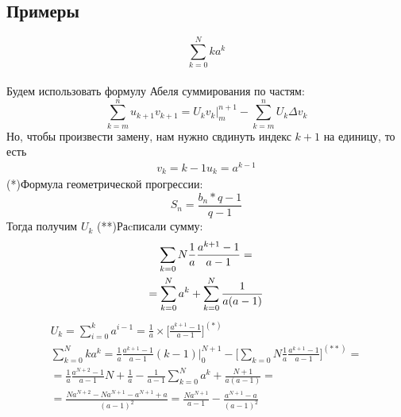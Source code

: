 \documentclass[a4paper,11pt]{article}
\begin{document}
  \subsection{Примеры}
    \[\sum_{k=0}^N ka^k\] \\
    Будем использовать формулу Абеля суммирования по частям: \\
    \[\sum_{k=m}^{n} u_{k+1} v_{k+1} = U_k v_k \bigg|_{m}^{n+1} - \sum_{k=m}^{n} U_k \Delta v_k\]
    Но, чтобы произвести замену, нам нужно свдинуть индекс $k+1$ на единицу, то есть \\
    \begin{equation*}
      \begin{split}
      v_k = k - 1
      u_k = a^{k-1}
      \end{split}
    \end{equation*}
    \marginpar
    {
      \footnotesize (*)Формула геометрической прогрессии:
      \footnotesize \[S_n = \frac{b_n*q-1}{q-1}\]
    }
    Тогда получим $U_k$
    \marginpar
    {
      \footnotesize (**)Раcписали сумму:
      \begin{gather*}
        \footnotesize \sum_{k=0}{N} \frac{1}{a} \frac{a^{k+1}-1}{a-1} = \\
        = \sum_{k=0}^{N}a^k + \sum_{k=0}^{N}\frac{1}{a(a-1)}
      \end{gather*}
    }
    \begin{equation*}
      \begin{split}
        U_k = \sum_{i=0}^{k}a^{i-1} = \frac{1}{a} \times \bigg[ \frac{a^{k+1}-1}{a-1} \bigg]^{(*)} \\
        \sum_{k=0}^{N}ka^k = \frac{1}{a} \frac{a^{k+1}-1}{a-1}(k-1) \bigg|_{0}^{N+1} - \bigg[\sum_{k=0}{N} \frac{1}{a} \frac{a^{k+1}-1}{a-1} \bigg]^{(**)} = \\
        = \frac{1}{a} \frac{a^{N+2}-1}{a-1}N + \frac{1}{a} - \frac{1}{a-1} \sum_{k=0}^{N}a^k + \frac{N+1}{a(a-1)} = \\
        = \frac{Na^{N+2} - Na^{N+1} - a^{N+1} + a}{(a-1)^2}
        = \frac{Na^{N+1}}{a-1} - \frac{a^{N+1} - a}{(a-1)^2}
      \end{split}
    \end{equation*}
\newpage
\end{document}
